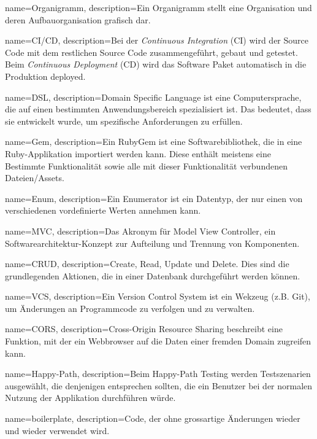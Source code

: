{
  name={Organigramm},
  description={Ein Organigramm stellt eine Organisation und deren Aufbauorganisation grafisch dar.}
}

{
  name={CI/CD},
  description={Bei der \emph{Continuous Integration} (CI) wird der Source Code mit dem restlichen Source Code zusammengeführt, gebaut und getestet.
      Beim \emph{Continuous Deployment} (CD) wird das Software Paket automatisch in die Produktion deployed.}
}

{
  name={DSL},
  description={Domain Specific Language ist eine Computersprache, die auf einen bestimmten Anwendungsbereich spezialisiert ist. Das bedeutet, dass sie entwickelt wurde, um spezifische Anforderungen zu erfüllen.}
}

{
  name={Gem},
  description={Ein RubyGem ist eine Softwarebibliothek, die in eine Ruby-Applikation importiert werden kann. Diese enthält meistens eine Bestimmte Funktionalität sowie alle mit dieser Funktionalität verbundenen Dateien/Assets.}
}

{
  name={Enum},
  description={Ein Enumerator ist ein Datentyp, der nur einen von verschiedenen vordefinierte Werten annehmen kann.}
}

{
  name={MVC},
  description={Das Akronym für Model View Controller, ein Softwarearchitektur-Konzept zur Aufteilung und Trennung von Komponenten.}
}

{
  name={CRUD},
  description={Create, Read, Update und Delete. Dies sind die grundlegenden Aktionen, die in einer Datenbank durchgeführt werden können.}
}

{
  name={VCS},
  description={Ein Version Control System ist ein Wekzeug (z.B. Git), um Änderungen an Programmcode zu verfolgen und zu verwalten.}
}


{
  name={CORS},
  description={Cross-Origin Resource Sharing beschreibt eine Funktion, mit der ein Webbrowser auf die Daten einer fremden Domain zugreifen kann.}
}

{
  name={Happy-Path},
  description={Beim Happy-Path Testing werden Testszenarien ausgewählt, die denjenigen entsprechen sollten, die ein Benutzer bei der normalen Nutzung der Applikation durchführen würde.}
}

{
  name={boilerplate},
  description={Code, der ohne grossartige Änderungen wieder und wieder verwendet wird.}
}
